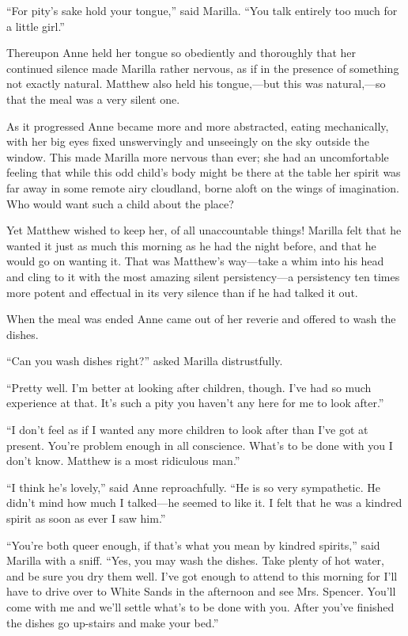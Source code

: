 \documentclass[a4paper]{article}
\begin{document}
\huge{``For pity's sake hold your tongue,'' said Marilla. ``You talk entirely too much for a little girl.''}

Thereupon Anne held her tongue so obediently and thoroughly that her continued silence made Marilla rather nervous, as if in the presence of something not exactly natural. Matthew also held his tongue,---but this was natural,---so that the meal was a very silent one.

As it progressed Anne became more and more abstracted, eating mechanically, with her big eyes fixed unswervingly and unseeingly on the sky outside the window. This made Marilla more nervous than ever; she had an uncomfortable feeling that while this odd child's body might be there at the table her spirit was far away in some remote airy cloudland, borne aloft on the wings of imagination. Who would want such a child about the place?

\Huge{Yet Matthew wished to keep her, of all unaccountable things! Marilla felt that he wanted it just as much this morning as he had the night before, and that he would go on wanting it. That was Matthew's way---take a whim into his head and cling to it with the most amazing silent persistency---a persistency ten times more potent and effectual in its very silence than if he had talked it out.}

When the meal was ended Anne came out of her reverie and offered to wash the dishes.

``Can you wash dishes right?'' asked Marilla distrustfully.

\tiny{``Pretty well. I'm better at looking after children, though. I've had so much experience at that. It's such a pity you haven't any here for me to look after.''

``I don't feel as if I wanted any more children to look after than I've got at present. You're problem enough in all conscience. What's to be done with you I don't know. Matthew is a most ridiculous man.''

``I think he's lovely,'' said Anne reproachfully. ``He is so very sympathetic. He didn't mind how much I talked---he seemed to like it. I felt that he was a kindred spirit as soon as ever I saw him.''

``You're both queer enough, if that's what you mean by kindred spirits,'' said Marilla with a sniff. ``Yes, you may wash the dishes. Take plenty of hot water, and be sure you dry them well. I've got enough to attend to this morning for I'll have to drive over to White Sands in the afternoon and see Mrs. Spencer. You'll come with me and we'll settle what's to be done with you. After you've finished the dishes go up-stairs and make your bed.''}
\end{document}

